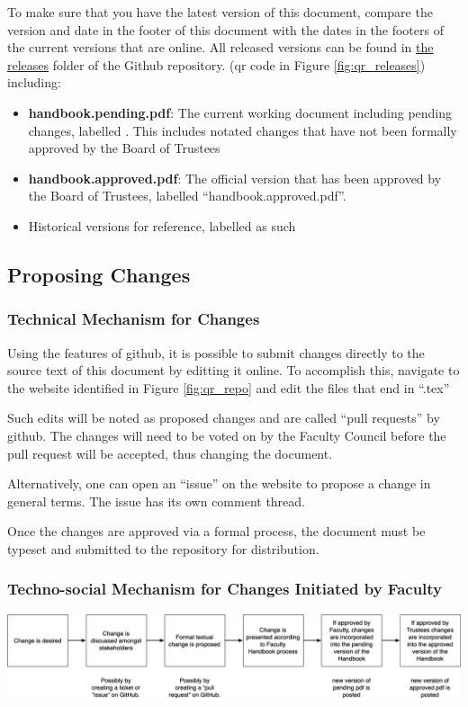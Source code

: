 		To make sure that you have the latest version of this document, compare the version and date in the
		footer of this document with the dates in the footers of the current versions that are online.
		All released versions can be found in
		\href{https://github.com/djp3/WestmontFacultyHandbook/tree/main/releases}{the releases} folder of the Github repository.
		(qr code in Figure \ref{fig:qr_releases}) including:
		\begin{itemize}
			\item{{\bfseries handbook.pending.pdf}:
				The current working document including pending changes, labelled
				. This includes notated changes that have not been formally approved by the Board of Trustees}
			\item{{\bfseries handbook.approved.pdf}:
				The official version that has been approved by the Board of Trustees, labelled ``handbook.approved.pdf''.}
			\item{Historical versions for reference, labelled as such}
		\end{itemize}

	\subsection{Proposing Changes}
		\subsubsection{Technical Mechanism for Changes}
			Using the features of github, it is possible to submit changes
			directly to the source text of this document by editting
			it online. To accomplish this,
			navigate to the website identified in Figure \ref{fig:qr_repo} and
			edit the files that end in ``.tex''

			Such edits will be noted as proposed changes and are called ``pull requests'' by github.
			The changes will need to be voted on by the Faculty Council before the pull request will be accepted, thus changing the document.

			Alternatively, one can open an ``issue'' on the website to propose a change in general terms.  The issue has its own
			comment thread.

			Once the changes are approved via a formal process, the document must be typeset and submitted to the repository for distribution.
		\subsubsection{Techno-social Mechanism for Changes Initiated by Faculty}
			\begin{center}
				\includegraphics[width=\textwidth]{images/change_process.png}
			\end{center}






